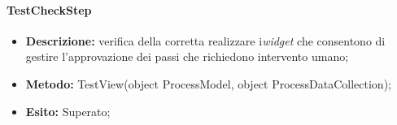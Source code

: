 \paragraph{TestCheckStep}
\begin{itemize}
\item \textbf{Descrizione:} verifica della corretta realizzare i\textit{widget} che consentono di gestire l'approvazione dei passi che richiedono intervento umano;
\item \textbf{Metodo:} TestView(object ProcessModel, object ProcessDataCollection);
\item \textbf{Esito:} Superato;
\end{itemize}
